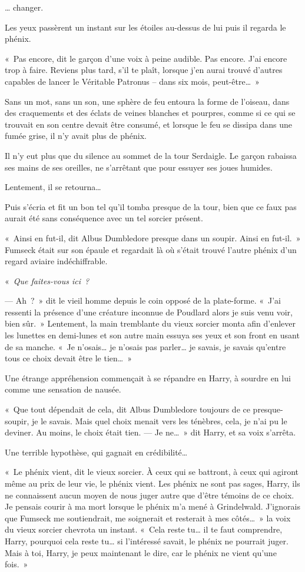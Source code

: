 … changer.

Les yeux passèrent un instant sur les étoiles au-dessus de lui puis il regarda le phénix.

«~Pas encore, dit le garçon d'une voix à peine audible. Pas encore. J'ai encore trop à faire. Reviens plus tard, s'il te plaît, lorsque j'en aurai trouvé d'autres capables de lancer le Véritable Patronus -- dans six mois, peut-être…~»

Sans un mot, sans un son, une sphère de feu entoura la forme de l'oiseau, dans des craquements et des éclats de veines blanches et pourpres, comme si ce qui se trouvait en son centre devait être consumé, et lorsque le feu se dissipa dans une fumée grise, il n'y avait plus de phénix.

Il n'y eut plus que du silence au sommet de la tour Serdaigle. Le garçon rabaissa ses mains de ses oreilles, ne s'arrêtant que pour essuyer ses joues humides.

Lentement, il se retourna…

Puis s'écria et fit un bon tel qu'il tomba presque de la tour, bien que ce faux pas aurait été sans conséquence avec un tel sorcier présent.

«~Ainsi en fut-il, dit Albus Dumbledore presque dans un soupir. Ainsi en fut-il.~» Fumseck était sur son épaule et regardait là où s'était trouvé l'autre phénix d'un regard aviaire indéchiffrable.

«~\emph{Que faites-vous ici~? }

---  Ah~?~» dit le vieil homme depuis le coin opposé de la plate-forme. «~J'ai ressenti la présence d'une créature inconnue de Poudlard alors je suis venu voir, bien sûr.~» Lentement, la main tremblante du vieux sorcier monta afin d'enlever les lunettes en demi-lunes et son autre main essuya ses yeux et son front en usant de sa manche. «~Je n'osais… je n'osais pas parler… je savais, je savais qu'entre tous ce choix devait être le tien…~»

Une étrange appréhension commençait à se répandre en Harry, à sourdre en lui comme une sensation de nausée.

«~Que tout dépendait de cela, dit Albus Dumbledore toujours de ce presque-soupir, je le savais. Mais quel choix menait vers les ténèbres, cela, je n'ai pu le deviner. Au moins, le choix était tien.
---  Je ne…~» dit Harry, et sa voix s'arrêta.

Une terrible hypothèse, qui gagnait en crédibilité…

«~Le phénix vient, dit le vieux sorcier. À ceux qui se battront, à ceux qui agiront même au prix de leur vie, le phénix vient. Les phénix ne sont pas sages, Harry, ils ne connaissent aucun moyen de nous juger autre que d'être témoins de ce choix. Je pensais courir à ma mort lorsque le phénix m'a mené à Grindelwald. J'ignorais que Fumseck me soutiendrait, me soignerait et resterait à mes côtés…~» la voix du vieux sorcier chevrota un instant. «~Cela reste tu… il te faut comprendre, Harry, pourquoi cela reste tu… si l'intéressé savait, le phénix ne pourrait juger. Mais à toi, Harry, je peux maintenant le dire, car le phénix ne vient qu'une fois.~»

